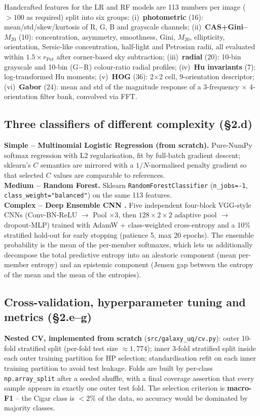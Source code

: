 \documentclass[10pt,a4paper]{article}
\begin{document}
Handcrafted features for the LR and RF models are 113 numbers per image (\(>\!100\) as required) split into six groups: (i)~\textbf{photometric} (16): mean/std/skew/kurtosis of R, G, B and grayscale channels; (ii)~\textbf{CAS+Gini--$M_{20}$} (10): concentration, asymmetry, smoothness, Gini, $M_{20}$, ellipticity, orientation, Sersic-like concentration, half-light and Petrosian radii, all evaluated within $1.5\!\times\!r_{\text{Pet}}$ after corner-based sky subtraction; (iii)~\textbf{radial} (20): 10-bin grayscale and 10-bin (G$-$R) colour-ratio radial profiles; (iv)~\textbf{Hu invariants} (7): log-transformed Hu moments; (v)~\textbf{HOG} (36): 2$\times$2 cell, 9-orientation descriptor; (vi)~\textbf{Gabor} (24): mean and std of the magnitude response of a 3-frequency $\times$ 4-orientation filter bank, convolved via FFT.

\subsection{Three classifiers of different complexity (\S 2.d)}
\textbf{Simple -- Multinomial Logistic Regression (from scratch).} Pure-NumPy softmax regression with L2 regularisation, fit by full-batch gradient descent; sklearn's $C$ semantics are mirrored with a $1/N$-normalised penalty gradient so that selected $C$ values are comparable to references.\\
\textbf{Medium -- Random Forest.} Sklearn \texttt{RandomForestClassifier} (\texttt{n\_jobs=-1}, \texttt{class\_weight="balanced"}) on the same 113 features.\\
\textbf{Complex -- Deep Ensemble CNN \citep{lakshminarayanan2017}.} Five independent four-block VGG-style CNNs (Conv-BN-ReLU $\rightarrow$ Pool $\times 3$, then $128\!\times\!2\!\times\!2$ adaptive pool $\rightarrow$ dropout-MLP) trained with AdamW + class-weighted cross-entropy and a 10\% stratified hold-out for early stopping (patience 5, max 20 epochs). The ensemble probability is the mean of the per-member softmaxes, which lets us additionally decompose the total predictive entropy into an aleatoric component (mean per-member entropy) and an epistemic component (Jensen gap between the entropy of the mean and the mean of the entropies).

\subsection{Cross-validation, hyperparameter tuning and metrics (\S 2.e--g)}
\textbf{Nested CV, implemented from scratch} (\texttt{src/galaxy\_uq/cv.py}): outer 10-fold stratified split (per-fold test size $\approx\!1{,}774$); inner 3-fold stratified split inside each outer training partition for HP selection; standardisation refit on each inner training partition to avoid test leakage. Folds are built by per-class \texttt{np.array\_split} after a seeded shuffle, with a final coverage assertion that every sample appears in exactly one outer test fold. The selection criterion is \textbf{macro-F1} -- the Cigar class is $<2\%$ of the data, so accuracy would be dominated by majority classes.
\end{document}
